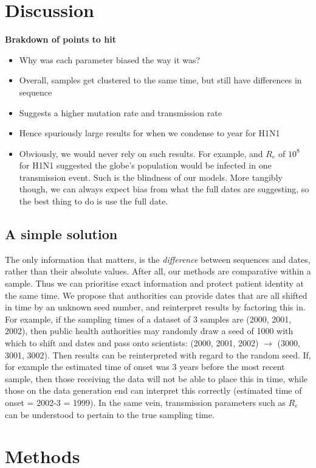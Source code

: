 \documentclass{article}
\begin{document}
\begin{spacing}{1.5}
\section*{Discussion}
\textbf{Brakdown of points to hit}
\begin{itemize}
    \item Why was each parameter biased the way it was?
    \item Overall, samples get clustered to the same time, but still have differences in sequence
    \item Suggests a higher mutation rate and transmission rate
    \item Hence spuriously large results for when we condense to year for H1N1
    \item Obviously, we would never rely on such results. For example, and $R_e$ of $10^8$ for H1N1 suggested the globe's population would be infected in one transmission event. Such is the blindness of our models. More tangibly though, we can always expect bias from what the full dates are suggesting, so the best thing to do is use the full date.
\end{itemize}
\subsection*{A simple solution}
The only information that matters, is the \emph{difference} between sequences and dates, rather than their absolute values. After all, our methods are comparative within a sample. Thus we can prioritise exact information and protect patient identity at the same time. We propose that authorities can provide dates that are all shifted in time by an unknown seed number, and reinterpret results by factoring this in. For example, if the sampling times of a dataset of 3 samples are (2000, 2001, 2002), then public health authorities may randomly draw a seed of 1000 with which to shift and dates and pass onto scientists: (2000, 2001, 2002) $\rightarrow$ (3000, 3001, 3002). Then results can be reinterpreted with regard to the random seed. If, for example the estimated time of onset was 3 years before the most recent sample, then those receiving the data will not be able to place this in time, while those on the data generation end can interpret this correctly (estimated time of onset = 2002-3 = 1999). In the same vein, transmission parameters such as $R_e$ can be understood to pertain to the true sampling time.


\section*{Methods}

\end{spacing}
\end{document}
